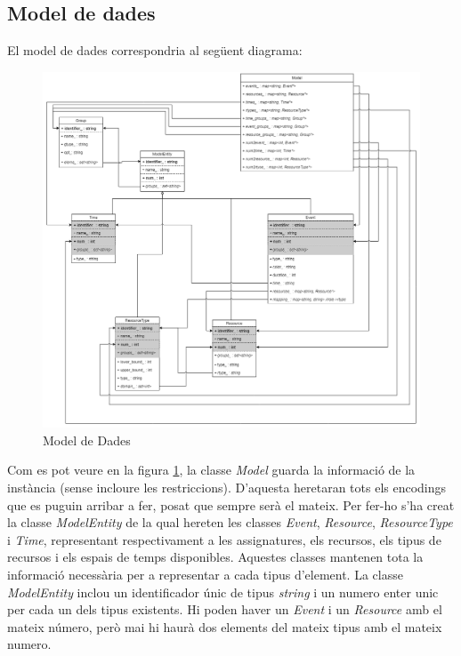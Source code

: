\documentclass[11pt,a4paper,twoside]{report}
\begin{document}
  \subsection{Model de dades}

  El model de dades correspondria al següent diagrama:
  \begin{figure}[H]
    \includegraphics[width=\textwidth]{Diagrames/ModelDades.png}
    \caption{Model de Dades}
    \label{fig:DataModel}
  \end{figure}

  Com es pot veure en la figura \ref{fig:DataModel}, la classe \textit{Model} guarda la informació de la instància (sense incloure les restriccions). D'aquesta heretaran tots els encodings que es puguin arribar a fer, posat que sempre serà el mateix.
  Per fer-ho s'ha creat la classe \textit{ModelEntity} de la qual hereten les classes \textit{Event}, \textit{Resource}, \textit{ResourceType} i \textit{Time},
  representant respectivament a les assignatures, els recursos, els tipus de recursos i els espais de temps disponibles. Aquestes classes mantenen tota la informació necessària per a representar a cada tipus d'element. La classe \textit{ModelEntity}
  inclou un identificador  únic de tipus \textit{string} i un numero enter unic per cada un dels tipus existents. Hi poden haver un \textit{Event} i un \textit{Resource} amb el mateix número, però mai hi haurà dos elements del mateix tipus amb el mateix numero.
\end{document}
